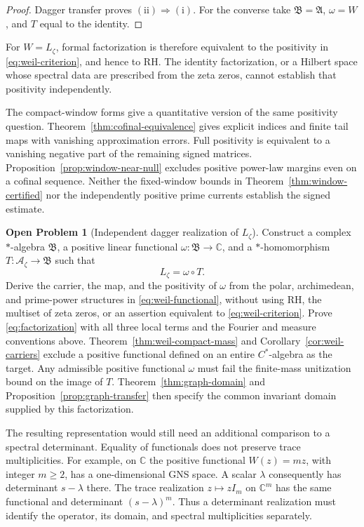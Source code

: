 \documentclass[11pt]{article}
\theoremstyle{definition}
\newtheorem{problem}[theorem]{Open Problem}
\theoremstyle{remark}
\numberwithin{equation}{section}
\newcommand{\cA}{\mathcal A}
\newcommand{\C}{\mathbb C}
\begin{document}
\begin{proof}
Dagger transfer proves $(\mathrm{ii})\Rightarrow(\mathrm{i})$.  For the converse take
$\mathfrak B=\mathfrak A$, $\omega=W$, and $T$ equal to the identity.
\end{proof}

For $W=L_\zeta$, formal factorization is therefore equivalent to the
positivity in \eqref{eq:weil-criterion}, and hence to RH.  The identity
factorization, or a Hilbert space whose spectral data are prescribed from
the zeta zeros, cannot establish that positivity independently.

The compact-window forms give a quantitative version of the same
positivity question.  Theorem~\ref{thm:cofinal-equivalence} gives explicit
indices and finite tail maps with vanishing approximation errors.
Full positivity is equivalent to a vanishing negative part of the
remaining signed matrices.  Proposition~\ref{prop:window-near-null}
excludes positive power-law margins even on a cofinal sequence.
Neither the fixed-window bounds in Theorem~\ref{thm:window-certified}
nor the independently positive prime currents establish the signed estimate.

\begin{problem}[Independent dagger realization of $L_\zeta$]
Construct a complex $*$-algebra $\mathfrak B$, a positive linear
functional $\omega:\mathfrak B\to\C$, and a $*$-homomorphism
$T:\cA_\zeta\to\mathfrak B$ such that
\begin{equation}
 L_\zeta=\omega\circ T.
 \label{eq:factorization}
\end{equation}
Derive the carrier, the map, and the positivity of $\omega$ from the
polar, archimedean, and prime-power structures in
\eqref{eq:weil-functional}, without using RH, the multiset of zeta zeros,
or an assertion equivalent to \eqref{eq:weil-criterion}.  Prove
\eqref{eq:factorization} with all three local terms and the Fourier and
measure conventions above.  Theorem~\ref{thm:weil-compact-mass} and Corollary~\ref{cor:weil-carriers}
exclude a positive functional defined on an entire $C^*$-algebra as the target.
Any admissible positive functional $\omega$ must fail the finite-mass
unitization bound on the image of $T$.
Theorem~\ref{thm:graph-domain} and
Proposition~\ref{prop:graph-transfer} then specify the common invariant
domain supplied by this factorization.
\end{problem}

The resulting representation would still need an additional comparison
to a spectral determinant.  Equality of functionals does not preserve
trace multiplicities.  For example, on $\C$ the positive functional
$W(z)=mz$, with integer $m\geq2$, has a one-dimensional GNS space.
A scalar $\lambda$ consequently has determinant $s-\lambda$ there.
The trace realization $z\mapsto zI_m$ on $\C^m$ has the same functional
and determinant $(s-\lambda)^m$.  Thus a determinant realization must
identify the operator, its domain, and spectral multiplicities separately.
\end{document}
